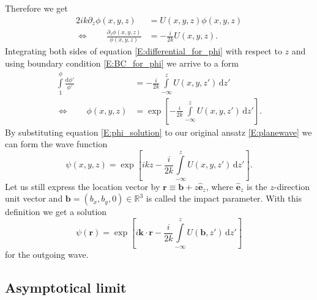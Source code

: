 \documentclass[a4paper, twoside, english, 12pt]{article}
\begin{document}
Therefore we get 
\begin{align}\label{E:differential_for_phi}
	2ik\partial_z\phi(x,y,z) &= U(x,y,z)\phi(x,y,z) \nonumber\\
\iff \qquad	\frac{\partial_z\phi(x,y,z)}{\phi(x,y,z)} &= -\frac{i}{2k}U(x,y,z).
\end{align}
Integrating both sides of equation \ref{E:differential_for_phi} with respect to $z$ and using boundary condition \ref{E:BC_for_phi} we arrive to a form
\begin{align}\label{E:phi_solution}
	\int\limits^{\phi}_{1}\frac{\text{d}\phi'}{\phi'} &= -\frac{i}{2k}\int\limits^{z}_{-\infty} U(x,y,z')\,\text{d}z' \nonumber\\
\iff \qquad	\phi(x,y,z) &= \exp\left[-\frac{i}{2k}\int\limits^{z}_{-\infty} U(x,y,z')\,\text{d}z'\right].
\end{align}
By substituting equation \ref{E:phi_solution} to our original ansatz \ref{E:planewave} we can form the wave function
\begin{equation}\label{E:wave_function_solution_xyz}
	\psi(x,y,z) = \exp\left[ikz-\frac{i}{2k}\int\limits^{z}_{-\infty} U(x,y,z')\,\text{d}z'\right].
\end{equation}
Let us still express the location vector by $\mathbf{r}\equiv \mathbf{b}+z\hat{\mathbf{e}}_z$, where $\hat{\mathbf{e}}_z$ is the $z$-direction unit vector and $\mathbf{b}=(b_x,b_y,0)\in\mathbb{R}^3$ is called the impact parameter. With this definition we get a solution
\begin{equation}\label{E:wave_function_solution}
	\psi(\mathbf{r}) = \exp\left[i\mathbf{k}\cdot\mathbf{r}-\frac{i}{2k}\int\limits^{z}_{-\infty} U(\mathbf{b},z')\,\text{d}z'\right]
\end{equation}
for the outgoing wave.



\subsection{Asymptotical limit}\label{SS:asymptotical_limit}






\newpage
\nocite{*}
\label{lastpage}
\appendix
\newpage
\end{document}
